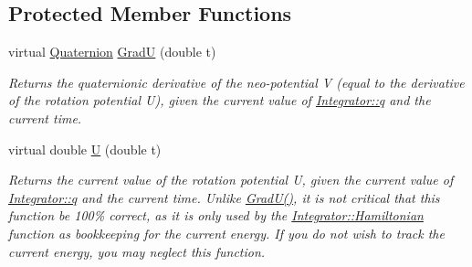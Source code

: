 \subsection*{Protected Member Functions}
\begin{DoxyCompactItemize}
\item 
virtual \hyperlink{classQDynamics_1_1Quaternion}{Quaternion} \hyperlink{classQDynamics_1_1Integrator_a4688fbccd8b0dc5c9a73dddac66b486f}{GradU} (double t)
\begin{DoxyCompactList}\small\item\em Returns the quaternionic derivative of the neo-\/potential V (equal to the derivative of the rotation potential U), given the current value of \hyperlink{classQDynamics_1_1Integrator_a5929511da076c7f31749a6da713fcff6}{Integrator\+::q} and the current time. \end{DoxyCompactList}\item 
virtual double \hyperlink{classQDynamics_1_1Integrator_afa838ba8dfb0fbde1f77c6d2a45a9dd0}{U} (double t)
\begin{DoxyCompactList}\small\item\em Returns the current value of the rotation potential U, given the current value of \hyperlink{classQDynamics_1_1Integrator_a5929511da076c7f31749a6da713fcff6}{Integrator\+::q} and the current time. Unlike \hyperlink{classQDynamics_1_1Integrator_a4688fbccd8b0dc5c9a73dddac66b486f}{Grad\+U()}, it is not critical that this function be 100\% correct, as it is only used by the \hyperlink{classQDynamics_1_1Integrator_a816743f6efb41b0b29243ff3bdaa4c9d}{Integrator\+::\+Hamiltonian} function as bookkeeping for the current energy. If you do not wish to track the current energy, you may neglect this function. \end{DoxyCompactList}\end{DoxyCompactItemize}
